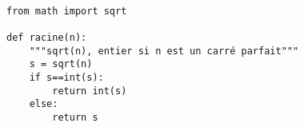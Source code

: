 \exer{}
\setcounter{numques}{0}

\question{} 
\begin{lstlisting}

from math import sqrt 

def racine(n):
    """sqrt(n), entier si n est un carré parfait"""
    s = sqrt(n)
    if s==int(s):
        return int(s)
    else:
        return s
\end{lstlisting}


